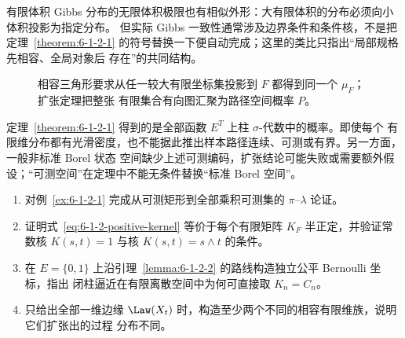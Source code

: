 有限体积 Gibbs 分布的无限体积极限也有相似外形：大有限体积的分布必须向小体积投影为指定分布。
但实际 Gibbs 一致性通常涉及边界条件和条件核，不是把
定理~\ref{theorem:6-1-2-1} 的符号替换一下便自动完成；这里的类比只指出“局部规格先相容、全局对象后
存在”的共同结构。

\begin{figure}[htbp]
\centering
{}
\caption{相容三角形要求从任一较大有限坐标集投影到 $F$ 都得到同一个 $\mu_F$；扩张定理把整张
有限集合有向图汇聚为路径空间概率 $P$。}
\label{fig:6-1-2-projective-family}
\end{figure}

\begin{remark}
定理~\ref{theorem:6-1-2-1} 得到的是全部函数 $E^T$ 上柱 $\sigma$-代数中的概率。即使每个
有限维分布都有光滑密度，也不能据此推出样本路径连续、可测或有界。另一方面，一般非标准 Borel 状态
空间缺少上述可测编码，扩张结论可能失败或需要额外假设；“可测空间”在定理中不能无条件替换“标准
Borel 空间”。
\end{remark}

\begin{exercise}
\begin{enumerate}
  \item 对例~\ref{ex:6-1-2-1} 完成从可测矩形到全部乘积可测集的 $\pi$--$\lambda$ 论证。
  \item 证明式~\eqref{eq:6-1-2-positive-kernel} 等价于每个有限矩阵 $K_F$ 半正定，并验证常数核
        $K(s,t)=1$ 与核 $K(s,t)=s\wedge t$ 的条件。
  \item 在 $E=\{0,1\}$ 上沿引理~\ref{lemma:6-1-2-2} 的路线构造独立公平 Bernoulli 坐标，指出
        闭柱逼近在有限离散空间中为何可直接取 $K_n=C_n$。
  \item 只给出全部一维边缘 $\Law(X_t)$ 时，构造至少两个不同的相容有限维族，说明它们扩张出的过程
        分布不同。
\end{enumerate}
\end{exercise}


